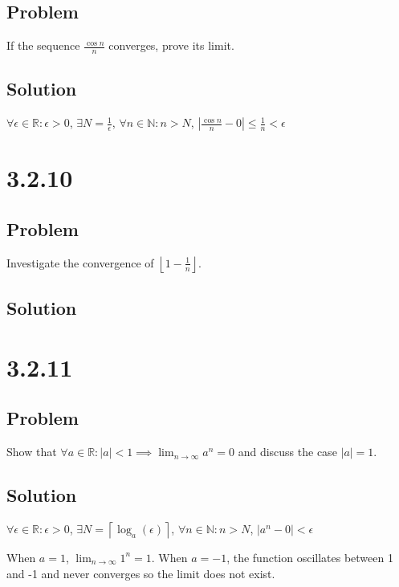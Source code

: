 \documentclass[12pt]{article}
\newcommand{\abs}  [1]{\left|       #1 \right|      }
\newcommand{\floor}[1]{\left\lfloor #1 \right\rfloor}
\newcommand{\ceil} [1]{\left\lceil  #1 \right\rceil }
\newcommand{\R}    [0]{\mathbb{R}                   }
\newcommand{\N}    [0]{\mathbb{N}                   }
\begin{document}
\subsection*{Problem}
If the sequence $\frac{\cos n}{n}$ converges, prove its limit.

\subsection*{Solution}
$\forall \epsilon \in \R : \epsilon > 0$, $\exists N = \frac{1}{\epsilon}$, $\forall n \in \N : n > N$, $\abs{\frac{\cos n}{n} - 0} \leq \frac{1}{n} < \epsilon$



\section*{3.2.10}

\subsection*{Problem}
Investigate the convergence of $\floor{1 - \frac{1}{n}}$.

\subsection*{Solution}



\section*{3.2.11}

\subsection*{Problem}
Show that $\forall a \in \R : \abs{a} < 1 \implies \lim_{n \to \infty} a^n = 0$ and discuss the case $\abs{a} = 1$.

\subsection*{Solution}
$\forall \epsilon \in \R : \epsilon > 0$, $\exists N = \ceil{\log_a(\epsilon)}$, $\forall n \in \N : n > N$, $\abs{a^n - 0} < \epsilon$

When $a = 1$, $\lim_{n \to \infty} 1^n = 1$. When $a = -1$, the function oscillates between 1 and -1 and never converges so the limit does not exist.
\end{document}
